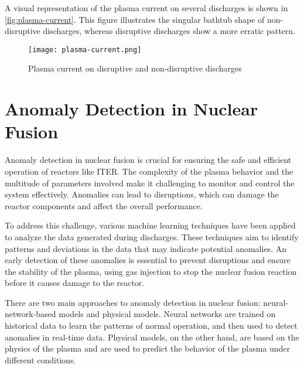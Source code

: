 A visual representation of the plasma current on several discharges is shown in \autoref{fig:plasma-current}. This figure illustrates the singular bathtub shape of non-disruptive discharges, whereas disruptive discharges show a more erratic pattern.

\begin{figure}[H]
    \centering
    \texttt{[image: plasma-current.png]}
    \caption{Plasma current on disruptive and non-disruptive discharges}
    \label{fig:plasma-current}
\end{figure}

\section{Anomaly Detection in Nuclear Fusion}

Anomaly detection in nuclear fusion is crucial for ensuring the safe and efficient operation of reactors like \ac{ITER}. The complexity of the plasma behavior and the multitude of parameters involved make it challenging to monitor and control the system effectively. Anomalies can lead to disruptions, which can damage the reactor components and affect the overall performance.

To address this challenge, various machine learning techniques have been applied to analyze the data generated during discharges. These techniques aim to identify patterns and deviations in the data that may indicate potential anomalies. An early detection of these anomalies is essential to prevent disruptions and ensure the stability of the plasma, using gas injection to stop the nuclear fusion reaction before it causes damage to the reactor.

There are two main approaches to anomaly detection in nuclear fusion: neural-network-based models and physical models. Neural networks are trained on historical data to learn the patterns of normal operation, and then used to detect anomalies in real-time data. Physical models, on the other hand, are based on the physics of the plasma and are used to predict the behavior of the plasma under different conditions.

